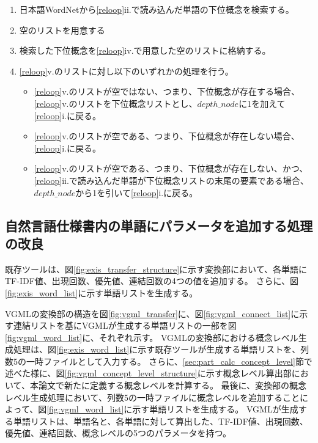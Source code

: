 \begin{enumerate}
\begin{enumerate}
\begin{enumerate}
                    \item 日本語WordNetから\ref{reloop}ii.で読み込んだ単語の下位概念を検索する。
                    \item 空のリストを用意する
                    \label{sec:lower_concept_list2}
                    \item 検索した下位概念を\ref{reloop}iv.で用意した空のリストに格納する。
                    \label{sec:update_lower_concept_list}
                    \item \ref{reloop}v.のリストに対し以下のいずれかの処理を行う。
                    \begin{itemize}
                        \item \ref{reloop}v.のリストが空ではない、つまり、下位概念が存在する場合、\ref{reloop}v.のリストを下位概念リストとし、$depth\_node$に1を加えて\ref{reloop}i.に戻る。
                        \item \ref{reloop}v.のリストが空である、つまり、下位概念が存在しない場合、\ref{reloop}i.に戻る。
                        \item \ref{reloop}v.のリストが空である、つまり、下位概念が存在しない、かつ、\ref{reloop}ii.で読み込んだ単語が下位概念リストの末尾の要素である場合、$depth\_node$から1を引いて\ref{reloop}i.に戻る。
                    \end{itemize}
                \end{enumerate}
        \end{enumerate}
\end{enumerate}

\subsection{自然言語仕様書内の単語にパラメータを追加する処理の改良}
\label{sec:improve_word_list}
既存ツールは、図\ref{fig:exis_transfer_structure}に示す変換部において、各単語にTF-IDF値、出現回数、優先値、連結回数の4つの値を追加する。
さらに、図\ref{fig:exis_word_list}に示す単語リストを生成する。

VGMLの変換部の構造を図\ref{fig:vgml_transfer}に、図\ref{fig:vgml_connect_list}に示す連結リストを基にVGMLが生成する単語リストの一部を図\ref{fig:vgml_word_list}に、それぞれ示す。
VGMLの変換部における概念レベル生成処理は、図\ref{fig:exis_word_list}に示す既存ツールが生成する単語リストを、列数5の一時ファイルとして入力する。
さらに、\ref{sec:part_calc_concept_level}節で述べた様に、図\ref{fig:vgml_concept_level_structure}に示す概念レベル算出部において、本論文で新たに定義する概念レベルを計算する。
最後に、変換部の概念レベル生成処理において、列数5の一時ファイルに概念レベルを追加することによって、図\ref{fig:vgml_word_list}に示す単語リストを生成する。
VGMLが生成する単語リストは、単語名と、各単語に対して算出した、TF-IDF値、出現回数、優先値、連結回数、概念レベルの5つのパラメータを持つ。

